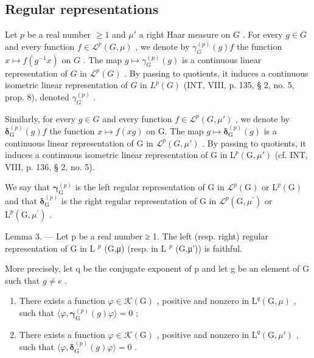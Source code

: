 \subsection{Regular representations}

Let \(p\) be a real number \(\geqslant 1\) and \(\mu'\) a right Haar measure on \(G\) . For every \(g \in G\) and every function \(f \in \mathcal{L}^p(G, \mu)\) , we denote by \(\gamma_G^{(p)}(g)f\) the function \(x \mapsto f(g^{-1}x)\) on \(G\) . The map \(g \mapsto \gamma_G^{(p)}(g)\) is a continuous linear representation of \(G\) in \(\mathcal{L}^p(G)\) . By passing to quotients, it induces a continuous isometric linear representation of \(G\) in \(L^p(G)\) (INT, VIII, p. 135, § 2, no. 5, prop. 8), denoted \(\gamma_G^{(p)}\) .

Similarly, for every \(g \in G\) and every function \(f \in \mathcal{L}^{p}(G, \mu')\) , we denote by \(\boldsymbol{\delta}_{\mathrm{G}}^{(p)}(g)f\) the function \(x \mapsto f(xg)\) on G. The map \(g \mapsto \boldsymbol{\delta}_{\mathrm{G}}^{(p)}(g)\) is a continuous linear representation of G in \(\mathcal{L}^{p}(G, \mu')\) . By passing to quotients, it induces a continuous isometric linear representation of G in \(\mathrm{L}^{p}(\mathrm{G}, \mu')\) (cf. INT, VIII, p. 136, § 2, no. 5).

We say that \(\boldsymbol{\gamma}_{\mathrm{G}}^{(p)}\) is the left regular representation of G in \(\mathcal{L}^{p}(\mathrm{G})\) or \(\mathrm{L}^{p}(\mathrm{G})\) and that \(\boldsymbol{\delta}_{\mathrm{G}}^{(p)}\) is the right regular representation of G in \(\mathcal{L}^{p}(\mathrm{G},\mu^{\prime})\) or \(\mathrm{L}^{p}(\mathrm{G},\mu^{\prime})\) .

Lemma 3. — Let p be a real number ≥ 1. The left (resp. right) regular representation of G in L \(^{p}\) (G,μ) (resp. in L \(^{p}\) (G,μ')) is faithful.

More precisely, let q be the conjugate exponent of p and let g be an element of G such that \(g \neq e\) .

\begin{enumerate}
\def\labelenumi{\alph{enumi})}
\item
  There exists a function \(\varphi\in\mathcal{K}(\mathrm{G})\) , positive and nonzero in \(\mathrm{L}^{q}(\mathrm{G},\mu)\) , such that \(\langle\varphi,\boldsymbol{\gamma}_{\mathrm{G}}^{(p)}(g)\varphi\rangle=0\) ;
\item
  There exists a function \(\varphi\in\mathcal{K}(\mathrm{G})\) , positive and nonzero in \(\mathrm{L}^{q}(\mathrm{G},\mu')\) , such that \(\langle\varphi,\boldsymbol{\delta}_{\mathrm{G}}^{(p)}(g)\varphi\rangle=0\) .
\end{enumerate}

